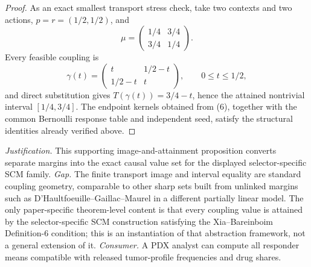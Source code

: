 \documentclass{article}
\begin{document}
\begin{proof}
As an exact smallest transport stress check, take two contexts and two actions, \(p=r=(1/2,1/2)\), and
\[
\mu=\begin{pmatrix}1/4&3/4\\3/4&1/4\end{pmatrix}.
\]
Every feasible coupling is
\[
\gamma(t)=\begin{pmatrix}t&1/2-t\\1/2-t&t\end{pmatrix},
\qquad 0\leq t\leq1/2,
\]
and direct substitution gives \(T(\gamma(t))=3/4-t\), hence the attained nontrivial interval \([1/4,3/4]\).  The endpoint kernels obtained from (6), together with the common Bernoulli response table and independent seed, satisfy the structural identities already verified above.
\end{proof}
\par\smallskip\noindent \textit{Justification.} This supporting image-and-attainment proposition converts separate margins into the exact causal value set for the displayed selector-specific SCM family. \textit{Gap.} The finite transport image and interval equality are standard coupling geometry, comparable to other sharp sets built from unlinked margins such as D'Haultfoeuille--Gaillac--Maurel in a different partially linear model. The only paper-specific theorem-level content is that every coupling value is attained by the selector-specific SCM construction satisfying the Xia--Bareinboim Definition-6 condition; this is an instantiation of that abstraction framework, not a general extension of it. \textit{Consumer.} A PDX analyst can compute all responder means compatible with released tumor-profile frequencies and drug shares.
\end{document}
